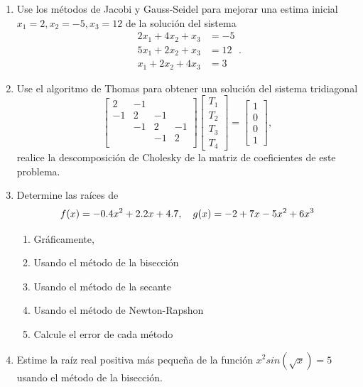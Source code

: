 \documentclass[11pt]{article}
\begin{document}
\begin{enumerate}
\item Use los m\'etodos de Jacobi y Gauss-Seidel para mejorar una estima inicial $x_1=2,x_2=-5,x_3=12$ de la soluci\'on del sistema
$$
\begin{array}{cl}
2x_1+4x_2+x_3 	& =-5\\
5x_1+2x_2+x_3 	&=12\\
x_1+2x_2+4x_3	&=3
\end{array}.
$$
\item Use el algoritmo de Thomas para obtener una soluci\'on del sistema tridiagonal
$$
\begin{bmatrix}
2	& -1 \\
-1	& 2 & -1 \\
&-1	& 2 & -1 \\
&    &-1	& 2  \\
\end{bmatrix}
\begin{bmatrix}
T_1\\T_2\\T_3\\T_4
\end{bmatrix}
=
\begin{bmatrix}
1\\ 0 \\0 \\1 \end{bmatrix},
$$
realice la descomposici\'on de Cholesky de la matriz de coeficientes de este problema. 

\item Determine las ra\'ices de
$$
f(x)=-0.4x^2+2.2x+4.7, 
\quad 
g(x)=-2+7x-5x^2+6x^3\\
$$
\begin{multicols}{3}
\begin{enumerate}
\item Gr\'aficamente,
\item Usando el m\'etodo de la bisecci\'on
\item Usando el m\'etodo de la secante 
\item Usando el m\'etodo de Newton-Rapshon
\item Calcule el error de cada m\'etodo
\end{enumerate}
\end{multicols}

\item 
Estime la ra\'iz real positiva m\'as peque\~{n}a de la funci\'on $x^2sin(\sqrt{x})=5$ usando el m\'etodo de la bisecci\'on.


\end{enumerate}
\end{document}
